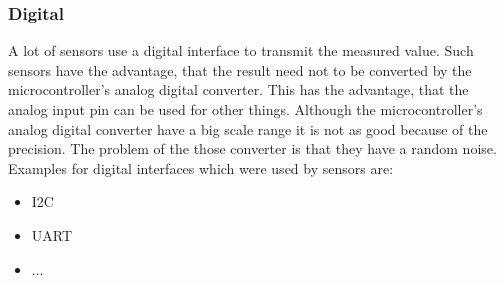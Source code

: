 \subsubsection{Digital}
A lot of sensors use a digital interface to transmit the measured value.
Such sensors have the advantage, that the result need not to be converted by the microcontroller's analog digital converter.
This has the advantage, that the analog input pin can be used for other things.
Although the microcontroller's analog digital converter have a big scale range it is not as good because of the precision.
The problem of the those converter is that they have a random noise.
Examples for digital interfaces which were used by sensors are:
\begin{itemize}
\item I2C
\item UART
\item ...
\end{itemize}


